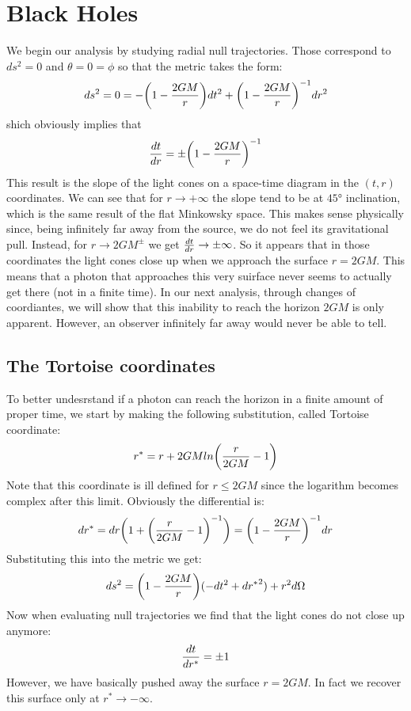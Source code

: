 \documentclass[]{article}
\theoremstyle{definition}
\theoremstyle{Theorem}
\theoremstyle{definition}
\theoremstyle{definition}
\theoremstyle{definition}
\begin{document}
\section{Black Holes}
We begin our analysis by studying radial null trajectories. Those correspond to $ds^2=0$ and $\theta=0=\phi$ so that the metric takes the form:
$$ds^2=0=-\bigg(1-{2GM\over r}\bigg)dt^2+\bigg(1-{2GM\over r}\bigg)^{-1}dr^2$$ 
shich obviously implies that
$${dt\over dr}=\pm \bigg(1-{2GM\over r}\bigg)^{-1}$$
This result is the slope of the light cones on a space-time diagram in the $(t,r)$ coordinates. We can see that for $r\rightarrow+\infty$ the slope tend to be at $45°$ inclination, which is the same result of the flat Minkowsky space. This makes sense physically since, being infinitely far away from the source, we do not feel its gravitational pull. Instead, for $r\rightarrow 2GM^\pm$ we get ${dt\over dr}\rightarrow\pm\infty$. So it appears that in those coordinates the light cones close up when we approach the surface $r=2GM$. This means that a photon that approaches this very suirface never seems to actually get there (not in a finite time). In our next analysis, through changes of coordiantes, we will show that this inability to reach the horizon $2GM$ is only apparent. However, an observer infinitely far away would never be able to tell.
\subsection{The Tortoise coordinates}
To better undesrstand if a photon can reach the horizon in a finite amount of proper time, we start by making the following substitution, called Tortoise coordinate:
$$r^*=r+2GMln\bigg({r\over 2GM}-1\bigg)$$
Note that this coordinate is ill defined for $r\leq2GM$ since the logarithm becomes complex after this limit.
Obviously the differential is:
$$dr^*=dr\bigg(1+\bigg({r\over 2GM}-1\bigg)^{-1}\bigg)=\bigg(1-{2GM\over r}\bigg)^{-1}dr$$
Substituting this into the metric we get:
$$ds^2=\bigg(1-{2GM\over r}\bigg)(-dt^2+{dr^*}^2)+r^2d\Omega$$
Now when evaluating null trajectories we find that the light cones do not close up anymore:
$${dt\over {dr^*}}=\pm1$$
However, we have basically pushed away the surface $r=2GM$. In fact we recover this surface only at $r^*\rightarrow -\infty$.
\end{document}
